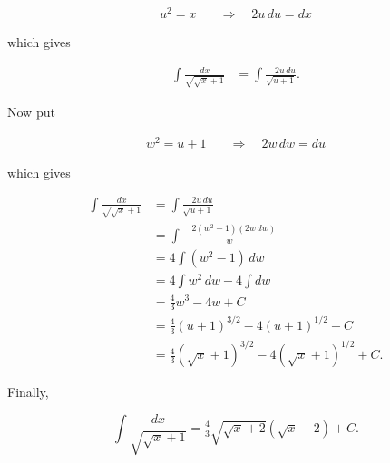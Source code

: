 \documentclass[12pt, letterpaper]{article}
\begin{document}
\begin{equation*}
\begin{aligned}
u^2 = x  \quad &\Rightarrow \quad 2u \, du = dx
\end{aligned}
\end{equation*}

which gives

\begin{equation*}
\begin{aligned}
\int \frac{dx}{\sqrt{\sqrt{x} + 1}}
  &= \int \frac{\quad 2u \, du}{\sqrt{u + 1}}.
\end{aligned}
\end{equation*}

Now put

\begin{equation*}
\begin{aligned}
w^2 = u + 1  \quad &\Rightarrow \quad 2w\, dw = du
\end{aligned}
\end{equation*}

which gives

\begin{equation*}
\begin{aligned}
\int \frac{dx}{\sqrt{\sqrt{x} + 1}}
  &= \int \frac{\quad 2u \, du}{\sqrt{u + 1}} \\[0.2in]
  &= \int \frac{\quad 2(w^2 - 1)(2w\, dw)}{w} \\[0.2in]
  &= 4 \int (w^2 - 1) \, dw \\[0.2in]
  &= 4 \int w^2 \, dw - 4 \int dw \\[0.2in]
  &= \tfrac{4}{3} w^3 - 4 w + C \\[0.2in]
  &= \tfrac{4}{3} (u + 1)^{3/2} - 4(u + 1)^{1/2} + C \\[0.2in]
  &= \tfrac{4}{3} \left( \sqrt{x} + 1 \right)^{3/2} - 4 \left( \sqrt{x} + 1 \right)^{1/2} + C.
\end{aligned}
\end{equation*}

Finally,

\begin{equation*}
\boxed
{
\int \frac{dx}{\sqrt{\sqrt{x} + 1}}
  = \tfrac{4}{3} \sqrt{\sqrt{x} + 2} \left( \sqrt{x} -2 \right) + C.
}
\end{equation*}
\end{document}
